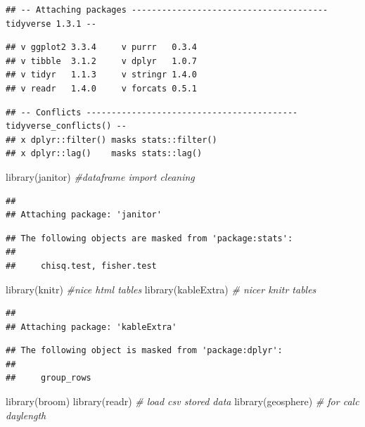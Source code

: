 \documentclass[
]{article}
\newenvironment{Shaded}{\begin{snugshade}}{\end{snugshade}}
\newcommand{\CommentTok}[1]{\textcolor[rgb]{0.56,0.35,0.01}{\textit{#1}}}
\newcommand{\FunctionTok}[1]{\textcolor[rgb]{0.00,0.00,0.00}{#1}}
\newcommand{\NormalTok}[1]{#1}
\begin{document}
\begin{verbatim}
## -- Attaching packages --------------------------------------- tidyverse 1.3.1 --
\end{verbatim}

\begin{verbatim}
## v ggplot2 3.3.4     v purrr   0.3.4
## v tibble  3.1.2     v dplyr   1.0.7
## v tidyr   1.1.3     v stringr 1.4.0
## v readr   1.4.0     v forcats 0.5.1
\end{verbatim}

\begin{verbatim}
## -- Conflicts ------------------------------------------ tidyverse_conflicts() --
## x dplyr::filter() masks stats::filter()
## x dplyr::lag()    masks stats::lag()
\end{verbatim}

\begin{Shaded}
\begin{Highlighting}[]
\FunctionTok{library}\NormalTok{(janitor) }\CommentTok{\#dataframe import cleaning}
\end{Highlighting}
\end{Shaded}

\begin{verbatim}
## 
## Attaching package: 'janitor'
\end{verbatim}

\begin{verbatim}
## The following objects are masked from 'package:stats':
## 
##     chisq.test, fisher.test
\end{verbatim}

\begin{Shaded}
\begin{Highlighting}[]
\FunctionTok{library}\NormalTok{(knitr) }\CommentTok{\#nice html tables}
\FunctionTok{library}\NormalTok{(kableExtra) }\CommentTok{\# nicer knitr tables}
\end{Highlighting}
\end{Shaded}

\begin{verbatim}
## 
## Attaching package: 'kableExtra'
\end{verbatim}

\begin{verbatim}
## The following object is masked from 'package:dplyr':
## 
##     group_rows
\end{verbatim}

\begin{Shaded}
\begin{Highlighting}[]
\FunctionTok{library}\NormalTok{(broom)}
\FunctionTok{library}\NormalTok{(readr) }\CommentTok{\# load csv stored data}
\FunctionTok{library}\NormalTok{(geosphere) }\CommentTok{\# for calc daylength}
\end{Highlighting}
\end{Shaded}
\end{document}
